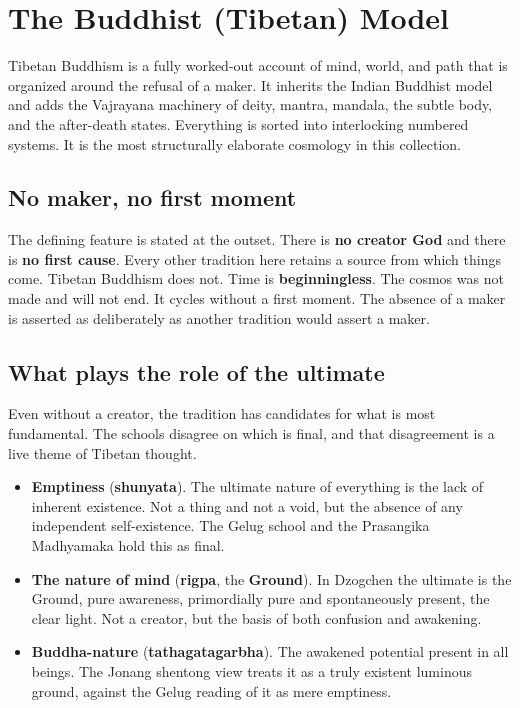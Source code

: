 \chapter{The Buddhist (Tibetan) Model}

Tibetan Buddhism is a fully worked-out account of mind, world, and path that is organized around the refusal of a maker. It inherits the Indian Buddhist model and adds the Vajrayana machinery of deity, mantra, mandala, the subtle body, and the after-death states. Everything is sorted into interlocking numbered systems. It is the most structurally elaborate cosmology in this collection.

\section*{No maker, no first moment}

The defining feature is stated at the outset. There is \textbf{no creator God} and there is \textbf{no first cause}. Every other tradition here retains a source from which things come. Tibetan Buddhism does not. Time is \textbf{beginningless}. The cosmos was not made and will not end. It cycles without a first moment. The absence of a maker is asserted as deliberately as another tradition would assert a maker.

\section*{What plays the role of the ultimate}

Even without a creator, the tradition has candidates for what is most fundamental. The schools disagree on which is final, and that disagreement is a live theme of Tibetan thought.

\begin{itemize}
 \item \textbf{Emptiness} (\textbf{shunyata}). The ultimate nature of everything is the lack of inherent existence. Not a thing and not a void, but the absence of any independent self-existence. The Gelug school and the Prasangika Madhyamaka hold this as final.
 \item \textbf{The nature of mind} (\textbf{rigpa}, the \textbf{Ground}). In Dzogchen the ultimate is the Ground, pure awareness, primordially pure and spontaneously present, the clear light. Not a creator, but the basis of both confusion and awakening.
 \item \textbf{Buddha-nature} (\textbf{tathagatagarbha}). The awakened potential present in all beings. The Jonang shentong view treats it as a truly existent luminous ground, against the Gelug reading of it as mere emptiness.
\end{itemize}

